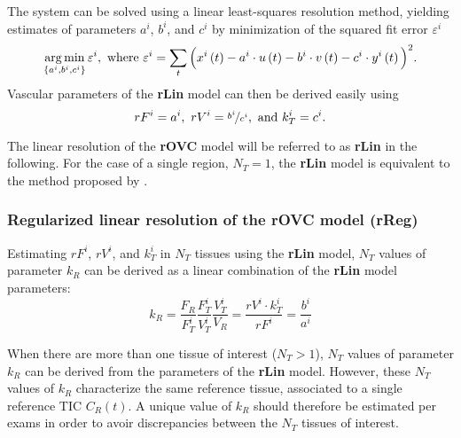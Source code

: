 The system can be solved using a linear least-squares resolution method, yielding estimates of parameters $a^i$, $b^i$, and $c^i$ by minimization of the squared fit error $\varepsilon^i$
\begin{equation}
\operatorname*{arg\,min}_{\left\lbrace a^i, b^i, c^i\right\rbrace} \varepsilon^i, \textrm{ where } \varepsilon^i = \sum_t \Big( x^i\left(t\right) - a^i\cdot u\left(t\right) - b^i\cdot v\left(t\right) - c^i\cdot y^i\left(t\right) \Big)^2.
\end{equation}
Vascular parameters of the \textbf{rLin} model can then be derived easily using
\begin{equation}
rF^i = a^i,~rV^i = \nicefrac{b^i}{c^i}, \textrm{ and } k_T^i = c^i.
\end{equation}

The linear resolution of the \textbf{rOVC} model will be referred to as \textbf{rLin} in the following.
For the case of a single region, $N_T = 1$, the \textbf{rLin} model is equivalent to the method proposed by \citet{CardenasRodriguez:2013em}.

\subsubsection{Regularized linear resolution of the rOVC model (rReg)}
Estimating $rF^i$, $rV^i$, and $k_T^i$ in $N_T$ tissues using the \textbf{rLin} model, $N_T$ values of parameter $k_R$ can be derived as a linear combination of the \textbf{rLin} model parameters:
\begin{equation}
k_R = \frac{F_R}{F_T^i}\frac{F_T^i}{V_T^i}\frac{V_T^i}{V_R} = \frac{rV^i \cdot k_T^i}{rF^i} = \frac{b^i}{a^i}
\label{eq:KR}
\end{equation}

When there are more than one tissue of interest ($N_T > 1$), $N_T$ values of parameter $k_R$ can be derived from the parameters of the \textbf{rLin} model. 
However, these $N_T$ values of $k_R$ characterize the same reference tissue, associated to a single reference TIC $C_R\left(t\right)$. 
A unique value of $k_R$ should therefore be estimated per exams in order to avoir discrepancies between the $N_T$ tissues of interest.

